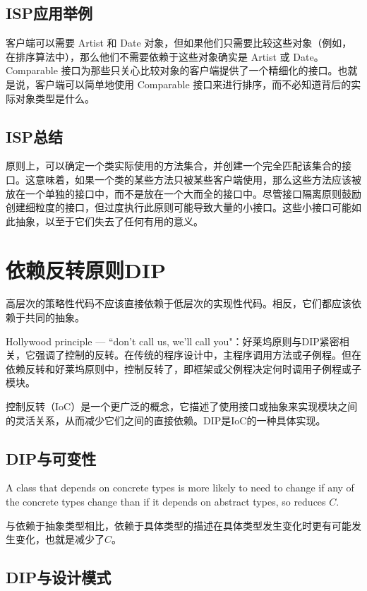 \subsection{ISP应用举例}

客户端可以需要 Artist 和 Date 对象，但如果他们只需要比较这些对象（例如，在排序算法中），那么他们不需要依赖于这些对象确实是 Artist 或 Date。
Comparable 接口为那些只关心比较对象的客户端提供了一个精细化的接口。也就是说，客户端可以简单地使用 Comparable 接口来进行排序，而不必知道背后的实际对象类型是什么。

\subsection{ISP总结}
原则上，可以确定一个类实际使用的方法集合，并创建一个完全匹配该集合的接口。这意味着，如果一个类的某些方法只被某些客户端使用，那么这些方法应该被放在一个单独的接口中，而不是放在一个大而全的接口中。尽管接口隔离原则鼓励创建细粒度的接口，但过度执行此原则可能导致大量的小接口。这些小接口可能如此抽象，以至于它们失去了任何有用的意义。


\section{依赖反转原则DIP}
高层次的策略性代码不应该直接依赖于低层次的实现性代码。相反，它们都应该依赖于共同的抽象。

Hollywood principle — ``don't call us, we'll call you"：好莱坞原则与DIP紧密相关，它强调了控制的反转。在传统的程序设计中，主程序调用方法或子例程。但在依赖反转和好莱坞原则中，控制反转了，即框架或父例程决定何时调用子例程或子模块。

控制反转（IoC）是一个更广泛的概念，它描述了使用接口或抽象来实现模块之间的灵活关系，从而减少它们之间的直接依赖。DIP是IoC的一种具体实现。

\subsection{DIP与可变性}
A class that depends on concrete types is more likely to need to change if any of the concrete types change than if it depends on abstract types, so reduces $C$.

与依赖于抽象类型相比，依赖于具体类型的描述在具体类型发生变化时更有可能发生变化，也就是减少了$C$。

\subsection{DIP与设计模式}

